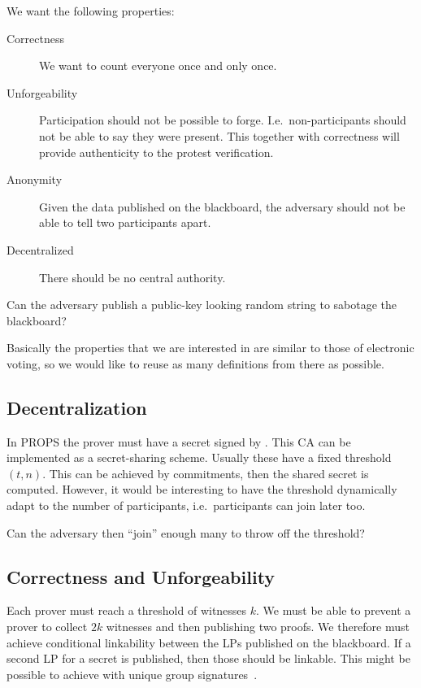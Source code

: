 We want the following properties:
\begin{description}
  \item[Correctness] We want to count everyone once and only once.
  \item[Unforgeability] Participation should not be possible to forge.
    I.e.\ non-participants should not be able to say they were present.
    This together with correctness will provide authenticity to the protest 
    verification.
  \item[Anonymity] Given the data published on the blackboard, the adversary 
    should not be able to tell two participants apart.
  \item[Decentralized] There should be no central authority.
\end{description}

Can the adversary publish a public-key looking random string to sabotage the 
blackboard?

Basically the properties that we are interested in are similar to those of 
electronic voting, so we would like to reuse as many definitions from there as 
possible.

\subsection{Decentralization}

In \ac{PROPS} the prover must have a secret signed by .
This \ac{CA} can be implemented as a secret-sharing scheme.
Usually these have a fixed threshold \((t, n)\).
This can be achieved by commitments, then the shared secret is computed.
However, it would be interesting to have the threshold dynamically adapt to the 
number of participants, i.e.\ participants can join later too.

Can the adversary then \enquote{join} enough many to throw off the threshold?

\subsection{Correctness and Unforgeability}

Each prover must reach a threshold of witnesses \(k\).
We must be able to prevent a prover to collect \(2k\) witnesses and then 
publishing two proofs.
We therefore must achieve conditional linkability between the \acp{LP} 
published on the blackboard.
If a second \ac{LP} for a secret is published, then those should be linkable.
This might be possible to achieve with unique group 
signatures~\cite{UniqueGroupSignatures,UniqueRingSignatures,ListSignatures}.


